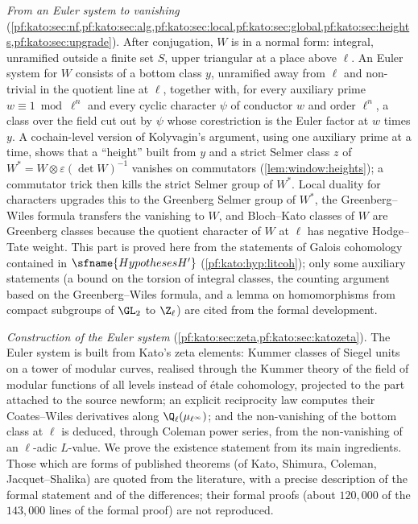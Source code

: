 \emph{From an Euler system to vanishing} (\cref{pf:kato:sec:nf,pf:kato:sec:alg,pf:kato:sec:local,pf:kato:sec:global,pf:kato:sec:heights,pf:kato:sec:upgrade}).
After conjugation, $W$ is in a normal form: integral, unramified outside a finite set $S$, upper triangular
at a place above $\ell$. An Euler system for $W$ consists of a bottom class $y$, unramified away from $\ell$ and
non-trivial in the quotient line at $\ell$, together with, for every auxiliary prime $w\equiv1\bmod\ell^n$ and
every cyclic character $\psi$ of conductor $w$ and order $\ell^n$, a class over the field cut out by $\psi$
whose corestriction is the Euler factor at $w$ times $y$. A cochain-level version of Kolyvagin's argument,
using one auxiliary prime at a time, shows that a ``height'' built from $y$ and a strict Selmer class $z$ of
$W^*=W\otimes\varepsilon(\det W)^{-1}$ vanishes on commutators (\cref{lem:window:heights}); a commutator trick then
kills the strict Selmer group of $W^*$. Local duality for characters upgrades this to the Greenberg Selmer
group of $W^*$, the Greenberg--Wiles formula transfers the vanishing to $W$, and Bloch--Kato classes of $W$ are
Greenberg classes because the quotient character of $W$ at $\ell$ has negative Hodge--Tate weight. This part is
proved here from the statements of Galois cohomology contained in $\sfname{HypothesesH'}$
(\cref{pf:kato:hyp:litcoh}); only some auxiliary statements (a bound on the torsion of integral classes, the
counting argument based on the Greenberg--Wiles formula, and a lemma on homomorphisms from compact subgroups of
$\GL_2$ to $\Z_\ell$) are cited from the formal development.

\emph{Construction of the Euler system} (\cref{pf:kato:sec:zeta,pf:kato:sec:katozeta}). The Euler system is built from Kato's zeta
elements: Kummer classes of Siegel units on a tower of modular curves, realised through the Kummer theory of the
field of modular functions of all levels instead of \'etale cohomology, projected to the part attached to the
source newform; an explicit reciprocity law computes their Coates--Wiles derivatives along
$\Q_\ell(\mu_{\ell^\infty})$; and the non-vanishing of the bottom class at $\ell$ is deduced, through Coleman
power series, from the non-vanishing of an $\ell$-adic $L$-value. We prove the existence statement from its main
ingredients. Those which are forms of published theorems (of Kato, Shimura, Coleman, Jacquet--Shalika) are quoted from the
literature, with a precise description of the formal statement and of the differences; their formal proofs (about $120{,}000$ of
the $143{,}000$ lines of the formal proof) are not reproduced.

